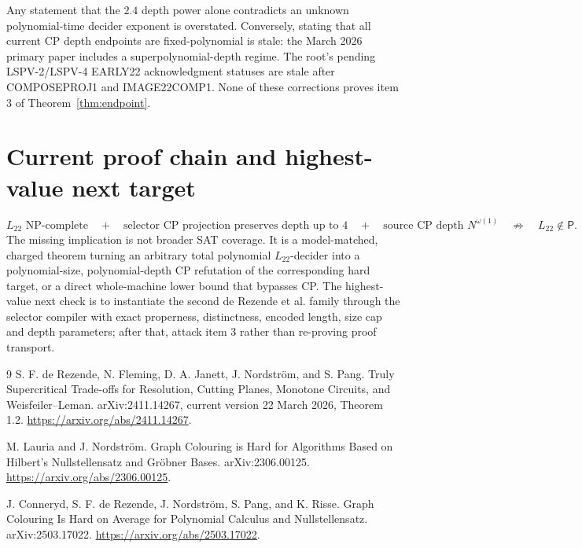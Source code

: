 \documentclass[11pt]{article}
\newcommand{\Ltwo}{L_{22}}
\begin{document}
Any statement that the $2.4$ depth power alone contradicts an unknown
polynomial-time decider exponent is overstated.  Conversely, stating that
all current CP depth endpoints are fixed-polynomial is stale: the March 2026
primary paper includes a superpolynomial-depth regime.  The root's pending
LSPV-2/LSPV-4 EARLY22 acknowledgment statuses are stale after COMPOSEPROJ1
and IMAGE22COMP1.  None of these corrections proves item 3 of
Theorem~\ref{thm:endpoint}.

\section{Current proof chain and highest-value next target}

\[
\boxed{\Ltwo\text{ NP-complete}}
\quad+\quad
\boxed{\text{selector CP projection preserves depth up to }4}
\quad+\quad
\boxed{\text{source CP depth }N^{\omega(1)}}
\quad\not\Longrightarrow\quad
\boxed{\Ltwo\notin\mathsf P}.
\]
The missing implication is not broader SAT coverage.  It is a
model-matched, charged theorem turning an arbitrary total polynomial
\(\Ltwo\)-decider into a polynomial-size, polynomial-depth CP refutation
of the corresponding hard target, or a direct whole-machine lower bound
that bypasses CP.  The highest-value next check is to instantiate the second
de Rezende et al. family through the selector compiler with exact properness,
distinctness, encoded length, size cap and depth parameters; after that,
attack item 3 rather than re-proving proof transport.

\begin{thebibliography}{9}
S. F. de Rezende, N. Fleming, D. A. Janett, J. Nordstr\"om, and S. Pang.
Truly Supercritical Trade-offs for Resolution, Cutting Planes, Monotone
Circuits, and Weisfeiler--Leman. arXiv:2411.14267, current version
22 March 2026, Theorem 1.2.
\url{https://arxiv.org/abs/2411.14267}.

M. Lauria and J. Nordstr\"om.
Graph Colouring is Hard for Algorithms Based on Hilbert's Nullstellensatz
and Gr\"obner Bases. arXiv:2306.00125.
\url{https://arxiv.org/abs/2306.00125}.

J. Conneryd, S. F. de Rezende, J. Nordstr\"om, S. Pang, and K. Risse.
Graph Colouring Is Hard on Average for Polynomial Calculus and
Nullstellensatz. arXiv:2503.17022.
\url{https://arxiv.org/abs/2503.17022}.
\end{thebibliography}

\end{document}
